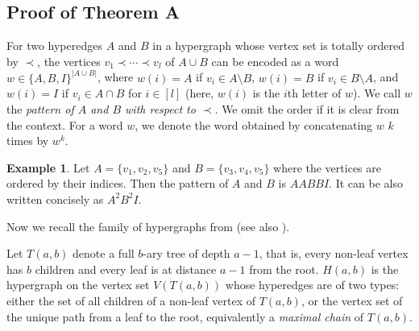 \documentclass{article}
\theoremstyle{definition}
\newtheorem{eg}[thm]{Example}
\begin{document}
\subsection{Proof of Theorem A}
\label{subsection_proof_Theorem A}

For two hyperedges $A$ and $B$ in a hypergraph whose vertex set is totally ordered by $\prec$, the vertices $v_1 \prec \cdots \prec v_l$ of $A\cup B$ can be encoded as a word $w \in \{A, B, I\}^{|A\cup B|}$, where $w(i)=A$ if $v_i \in A\setminus B$, $w(i)=B$ if $v_i \in B\setminus A$, and $w(i)=I$ if $v_i \in A \cap B$ for $i\in [l]$ (here, $w(i)$ is the $i$th letter of $w$). We call $w$ the \textit{pattern of $A$ and $B$ with respect to $\prec$}. We omit the order if it is clear from the context. For a word $w$, we denote the word obtained by concatenating $w$ $k$ times by $w^k$. 


\begin{eg}
	Let $A=\{v_1, v_2, v_5\}$ and $B=\{v_3,v_4, v_5\}$ where the vertices are ordered by their indices. Then the pattern of $A$ and $B$ is $AABBI$. It can be also written concisely as $A^2B^2I$. 
\end{eg}

\medskip

Now we recall the family of hypergraphs from \cite[Section 3]{ABAB_stabbed_pseudodisk} (see also \cite{ABABA_construction_pach, abstract_polychromatic}).

\smallskip 

Let $T(a,b)$ denote a full $b$-ary tree of depth $a-1$, that is, every non-leaf vertex has $b$ children and every leaf is at distance $a-1$ from the root. $H(a,b)$ is the hypergraph on the vertex set $V(T(a,b))$ whose hyperedges are of two types: either the set of all children of a non-leaf vertex of $T(a,b)$, or the vertex set of the unique path from a leaf to the root, equivalently a \textit{maximal chain} of $T(a,b)$.
\end{document}

